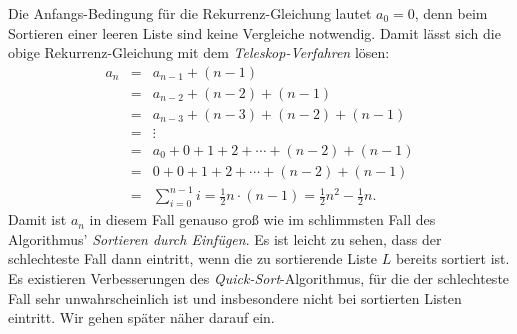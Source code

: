 Die Anfangs-Bedingung f\"ur die Rekurrenz-Gleichung lautet $a_0 = 0$, denn beim Sortieren einer leeren Liste sind keine
Vergleiche notwendig.  Damit l\"asst sich die obige Rekurrenz-Gleichung mit dem \emph{Teleskop-Verfahren} l\"osen:
\[
\begin{array}{lcl}
  a_n & = & a_{n-1} + (n-1) \\
      & = & a_{n-2} + (n-2) + (n-1) \\
      & = & a_{n-3} + (n-3) + (n-2) + (n-1) \\
      & = & \vdots \\
      & = & a_{0} + 0 + 1 + 2 + \cdots  + (n-2) + (n-1) \\
      & = & 0 + 0 + 1 + 2 + \cdots  + (n-2) + (n-1) \\[0.2cm]
      & = & \sum\limits_{i=0}^{n-1} i  =  \frac{1}{2} n \cdot(n - 1) =\frac{1}{2} n^2 - \frac{1}{2} n.
\end{array}
\]
Damit ist $a_n$ in diesem Fall genauso gro{\ss} wie im schlimmsten Fall des Algorithmus'
\emph{Sortieren durch Einf\"ugen}. 
Es ist leicht zu sehen, dass der schlechteste Fall dann eintritt, wenn die zu sortierende Liste $L$
bereits sortiert ist.  Es existieren Verbesserungen des \emph{Quick-Sort}-Algorithmus, f\"ur
die der schlechteste Fall sehr unwahrscheinlich ist und insbesondere nicht bei sortierten
Listen eintritt.  Wir gehen sp\"ater n\"aher darauf ein. 


